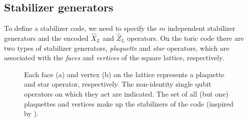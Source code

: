 \subsection{Stabilizer generators}

To define a stabilizer code, we need to specify the $m$ independent stabilizer generators and the encoded $\hat{X}_L$ and $\hat{Z}_L$ operators. On the toric code there are two types of stabilizer generators, \emph{plaquette} and \emph{star} operators, which are associated with the \emph{faces} and \emph{vertices} of the square lattice, respectively.
\begin{figure}
  \centering
  \hspace{1cm}

  \begin{center}
    \hspace{1cm}
  \end{center}

  \caption{Each face (a) and vertex (b) on the lattice represents a plaquette and star operator, respectively. The non-identity single qubit operators on which they act are indicated. The set of all (but one) plaquettes and vertices make up the stabilizers of the code (inspired by \cite{browne}).}\label{sf:fig_stabilizers}
\end{figure}

